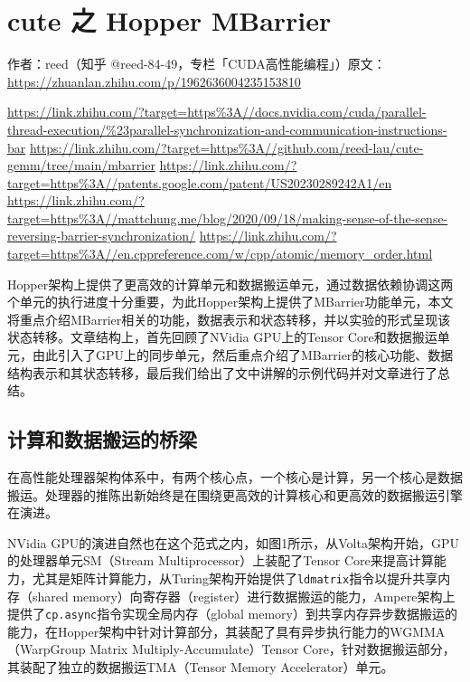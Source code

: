 \chapter{cute 之 Hopper MBarrier}

\begin{center}\small 作者：reed（知乎 @reed-84-49，专栏「CUDA高性能编程」）\quad 原文：\url{https://zhuanlan.zhihu.com/p/1962636004235153810}\end{center}

\urldef\reedVIIIurlA\url{https://link.zhihu.com/?target=https%3A//docs.nvidia.com/cuda/parallel-thread-execution/%23parallel-synchronization-and-communication-instructions-bar}
\urldef\reedVIIIurlB\url{https://link.zhihu.com/?target=https%3A//github.com/reed-lau/cute-gemm/tree/main/mbarrier}
\urldef\reedVIIIurlC\url{https://link.zhihu.com/?target=https%3A//patents.google.com/patent/US20230289242A1/en}
\urldef\reedVIIIurlD\url{https://link.zhihu.com/?target=https%3A//mattchung.me/blog/2020/09/18/making-sense-of-the-sense-reversing-barrier-synchronization/}
\urldef\reedVIIIurlE\url{https://link.zhihu.com/?target=https%3A//en.cppreference.com/w/cpp/atomic/memory_order.html}

Hopper架构上提供了更高效的计算单元和数据搬运单元，通过数据依赖协调这两个单元的执行进度十分重要，为此Hopper架构上提供了MBarrier功能单元，本文将重点介绍MBarrier相关的功能，数据表示和状态转移，并以实验的形式呈现该状态转移。文章结构上，首先回顾了NVidia GPU上的Tensor Core和数据搬运单元，由此引入了GPU上的同步单元，然后重点介绍了MBarrier的核心功能、数据结构表示和其状态转移，最后我们给出了文中讲解的示例代码并对文章进行了总结。

\section{计算和数据搬运的桥梁}

在高性能处理器架构体系中，有两个核心点，一个核心是计算，另一个核心是数据搬运。处理器的推陈出新始终是在围绕更高效的计算核心和更高效的数据搬运引擎在演进。

NVidia GPU的演进自然也在这个范式之内，如图1所示，从Volta架构开始，GPU的处理器单元SM（Stream Multiprocessor）上装配了Tensor Core来提高计算能力，尤其是矩阵计算能力，从Turing架构开始提供了\lstinline|ldmatrix|指令以提升共享内存（shared memory）向寄存器（register）进行数据搬运的能力，Ampere架构上提供了\lstinline|cp.async|指令实现全局内存（global memory）到共享内存异步数据搬运的能力，在Hopper架构中针对计算部分，其装配了具有异步执行能力的WGMMA（WarpGroup Matrix Multiply-Accumulate）Tensor Core，针对数据搬运部分，其装配了独立的数据搬运TMA（Tensor Memory Accelerator）单元。

